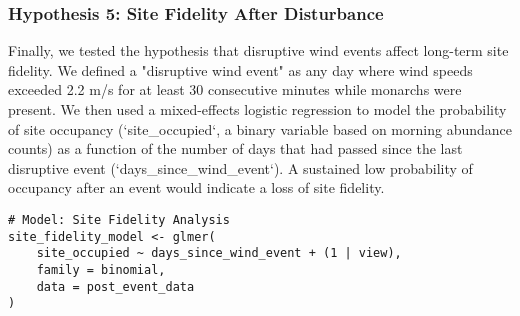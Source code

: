\subsubsection{Hypothesis 5: Site Fidelity After Disturbance}

Finally, we tested the hypothesis that disruptive wind events affect long-term site fidelity. We defined a "disruptive wind event" as any day where wind speeds exceeded 2.2 m/s for at least 30 consecutive minutes while monarchs were present. We then used a mixed-effects logistic regression to model the probability of site occupancy (`site_occupied`, a binary variable based on morning abundance counts) as a function of the number of days that had passed since the last disruptive event (`days_since_wind_event`). A sustained low probability of occupancy after an event would indicate a loss of site fidelity.

\begin{verbatim}
# Model: Site Fidelity Analysis
site_fidelity_model <- glmer(
    site_occupied ~ days_since_wind_event + (1 | view),
    family = binomial,
    data = post_event_data
)
\end{verbatim}
